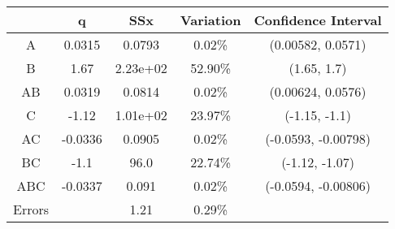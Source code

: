 \begin{center}
\begin{tabular}{|c|c|c|c|c|}
\cline{2-5}
\multicolumn{1}{c|}{} & q & SSx & Variation & Confidence Interval \\
\hline
A&0.0315&0.0793&0.02\% &(0.00582, 0.0571) \\
\hline
B&1.67&2.23e+02&52.90\% &(1.65, 1.7) \\
\hline
AB&0.0319&0.0814&0.02\% &(0.00624, 0.0576) \\
\hline
C&-1.12&1.01e+02&23.97\% &(-1.15, -1.1) \\
\hline
AC&-0.0336&0.0905&0.02\% &(-0.0593, -0.00798) \\
\hline
BC&-1.1&96.0&22.74\% &(-1.12, -1.07) \\
\hline
ABC&-0.0337&0.091&0.02\% &(-0.0594, -0.00806) \\
\hline
Errors& &1.21&0.29\% & \\
\hline
\end{tabular}
\end{center}
